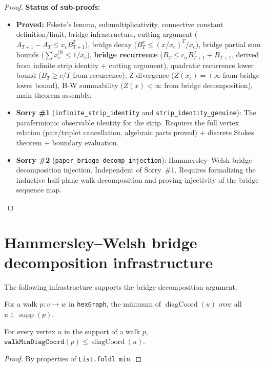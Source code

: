 \begin{lemma}
\begin{proof}
  \textbf{Status of sub-proofs:}
  \begin{itemize}
  \item \textbf{Proved:} Fekete's lemma, submultiplicativity,
        connective constant definition/limit, bridge infrastructure,
        cutting argument ($A_{T+1} - A_T \leq x_c B_{T+1}^2$),
        bridge decay ($B_T^x \leq (x/x_c)^T / x_c$),
        bridge partial sum bounds ($\sum x_c^{|b|} \leq 1/x_c$),
        \textbf{bridge recurrence} ($B_T \leq c_\alpha B_{T+1}^2 + B_{T+1}$,
        derived from infinite strip identity + cutting argument),
        quadratic recurrence lower bound ($B_T \geq c/T$ from recurrence),
        Z divergence ($Z(x_c) = +\infty$ from bridge lower bound),
        H-W summability ($Z(x) < \infty$ from bridge decomposition),
        main theorem assembly.
  \item \textbf{Sorry \#1} (\texttt{infinite\_strip\_identity} and
        \texttt{strip\_identity\_genuine}):
        The parafermionic observable identity for the strip.
        Requires the full vertex relation (pair/triplet
        cancellation, algebraic parts proved) + discrete Stokes theorem
        + boundary evaluation.
  \item \textbf{Sorry \#2} (\texttt{paper\_bridge\_decomp\_injection}):
        Hammersley--Welsh bridge decomposition injection. Independent
        of Sorry~\#1. Requires formalizing the inductive half-plane walk
        decomposition and proving injectivity of the bridge sequence map.
  \end{itemize}
\end{proof}

\section{Hammersley--Welsh bridge decomposition infrastructure}\label{sec:hw_infra}

The following infrastructure supports the bridge decomposition argument.

\begin{definition}\label{def:walkMinDiagCoord}
\leanok
  For a walk $p : v \to w$ in \texttt{hexGraph}, the minimum of
  $\operatorname{diagCoord}(u)$ over all $u \in \operatorname{supp}(p)$.
\end{definition}

\begin{lemma}\label{lem:walkMinDiagCoord_le}
\leanok
{}
  For every vertex $u$ in the support of a walk $p$,
  $\texttt{walkMinDiagCoord}(p) \leq \operatorname{diagCoord}(u)$.
\end{lemma}
\begin{proof}\leanok
  By properties of \texttt{List.foldl min}.
\end{proof}


\end{lemma}
